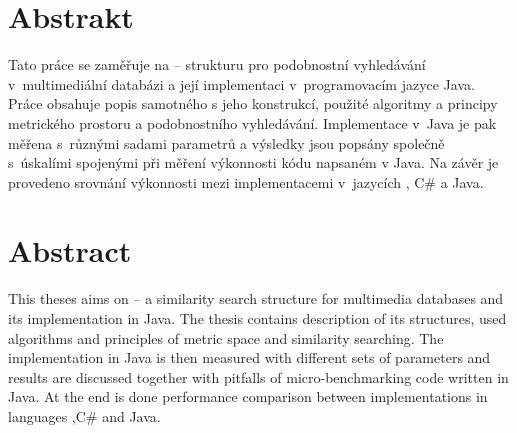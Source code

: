 \section*{Abstrakt}
Tato práce se zaměřuje na \MIndex{} -- strukturu pro podobnostní vyhledávání v~multimediální databázi a její implementaci v~programovacím jazyce Java.
Práce obsahuje popis samotného  s jeho konstrukcí, použité algoritmy a principy metrického prostoru a podobnostního vyhledávání.
Implementace v~Java je pak měřena s~různými sadami parametrů  a výsledky jsou popsány společně s~úskalími spojenými při měření výkonnosti kódu napsaném v Java.
Na závěr je provedeno srovnání výkonnosti mezi implementacemi  v~jazycích \CC, C\# a Java.

\section*{Abstract}
This theses aims on \MIndex{} -- a similarity search structure for multimedia databases and its implementation in Java.
The thesis contains description of \MIndex{} its structures, used algorithms and principles of metric space and similarity searching.
The implementation in Java is then measured with different sets of parameters and results are discussed together with pitfalls of micro-benchmarking code written in Java.
At the end is done performance comparison between \MIndex{} implementations in languages \CC,C\# and Java.
\newpage